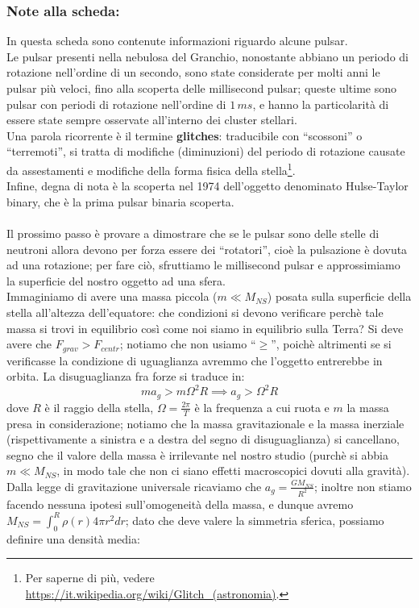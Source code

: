 \clearpage

\subsubsection{Note alla scheda:}
In questa scheda sono contenute informazioni riguardo alcune pulsar.\\
Le pulsar presenti nella nebulosa del Granchio, nonostante abbiano un periodo di rotazione nell'ordine di un secondo, sono state considerate per molti anni le pulsar più veloci, fino alla scoperta delle millisecond pulsar; queste ultime sono pulsar con periodi di rotazione nell'ordine di $1 \, ms$, e hanno la particolarità di essere state sempre osservate all'interno dei cluster stellari.\\
Una parola ricorrente è il termine \textbf{glitches}: traducibile con ``scossoni'' o ``terremoti'', si tratta di modifiche (diminuzioni) del periodo di rotazione causate da assestamenti e modifiche della forma fisica della stella\footnote{Per saperne di più, vedere \url{https://it.wikipedia.org/wiki/Glitch_(astronomia)}.}.\\
Infine, degna di nota è la scoperta nel 1974 dell'oggetto denominato Hulse-Taylor binary, che è la prima pulsar binaria scoperta.
\\
\\
Il prossimo passo è provare a dimostrare che se le pulsar sono delle stelle di neutroni allora devono per forza essere dei ``rotatori'', cioè la pulsazione è dovuta ad una rotazione; per fare ciò, sfruttiamo le millisecond pulsar e approssimiamo la superficie del nostro oggetto ad una sfera.\\
Immaginiamo di avere una massa piccola ($m \ll M_{NS}$) posata sulla superficie della stella all'altezza dell'equatore: che condizioni si devono verificare perchè tale massa si trovi in equilibrio così come noi siamo in equilibrio sulla Terra? Si deve avere che $F_{grav}>F_{centr}$; notiamo che non usiamo ``$\geq$'', poichè altrimenti se si verificasse la condizione di uguaglianza avremmo che l'oggetto entrerebbe in orbita. La disuguaglianza fra forze si traduce in:
$$m a_g > m \Omega^2 R \implies a_g > \Omega^2 R$$
dove $R$ è il raggio della stella, $\Omega= \frac{2 \pi}{T}$ è la frequenza a cui ruota e $m$ la massa presa in considerazione; notiamo che la massa gravitazionale e la massa inerziale (rispettivamente a sinistra e a destra del segno di disuguaglianza) si cancellano, segno che il valore della massa è irrilevante nel nostro studio (purchè si abbia $m \ll M_{NS}$, in modo tale che non ci siano effetti macroscopici dovuti alla gravità). Dalla legge di gravitazione universale ricaviamo che $a_g=\frac{GM_{NS}}{R^2}$; inoltre non stiamo facendo nessuna ipotesi sull'omogeneità della massa, e dunque avremo $M_{NS}= \int_0 ^R \rho(r) 4 \pi r^2 dr$; dato che deve valere la simmetria sferica, possiamo definire una densità media:
